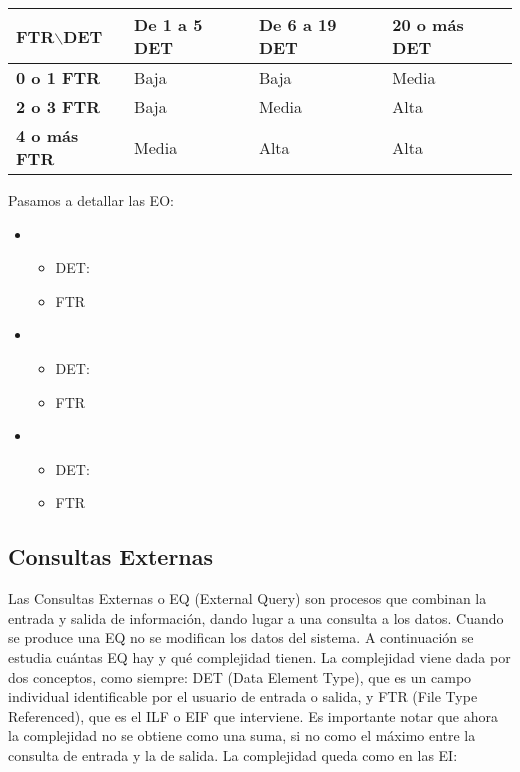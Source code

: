 \documentclass[spanish,a4paper,12pt]{report}	%
\begin{document}
\vspace{0.35cm}

			\begin{tabular}{|p{3cm}||p{3cm}|p{3.2cm}|p{3cm}|}
				\hline
				\textbf{FTR$\backslash$DET} & \textbf{De 1 a 5 DET} & \textbf{De 6 a 19 DET} & \textbf{20  o más DET} \\ \hline \hline
				\textbf{0 o 1 FTR} & Baja & Baja & Media \\ \hline 
				\textbf{2 o 3 FTR} & Baja & Media & Alta \\ \hline 
				\textbf{4 o más FTR} & Media & Alta & Alta \\ \hline 
			\end{tabular}

\vspace{0.35cm}

	Pasamos a detallar las EO:
	\begin{itemize}
		\item{} 
		\begin{itemize}
 			\item{DET:}
			\item{FTR}
		\end{itemize}	
		\item{} 
		\begin{itemize}
 			\item{DET:}
			\item{FTR}
		\end{itemize}
		\item{} 
		\begin{itemize}
 			\item{DET:}
			\item{FTR}
		\end{itemize}

	\end{itemize}



	\subsection{Consultas Externas}
	Las Consultas Externas o EQ (External Query) son procesos que combinan la entrada y salida de información, dando lugar a una consulta a los datos. Cuando se produce una EQ no se modifican los datos del sistema. A continuación se estudia cuántas EQ hay y qué complejidad tienen. La complejidad viene dada por dos conceptos, como siempre: DET (Data Element Type), que es un campo individual identificable por el usuario de entrada o salida, y FTR (File Type Referenced), que es el ILF o EIF que interviene. Es importante notar que ahora la complejidad no se obtiene como una suma, si no como el máximo entre la consulta de entrada y la de salida. La complejidad queda como en las EI: 
\end{document}
